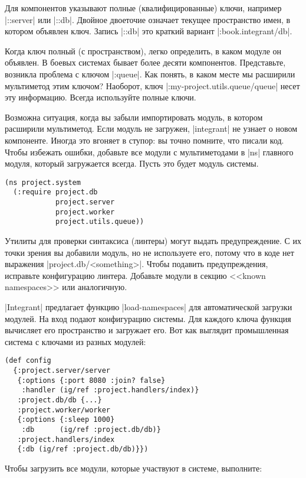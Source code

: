 Для компонентов указывают полные (квалифицированные) ключи, например
\spverb|::server| или \spverb|::db|. Двойное двоеточие означает текущее
пространство имен, в котором объявлен ключ. Запись \spverb|::db| это краткий
вариант \spverb|:book.integrant/db|.

Когда ключ полный (с пространством), легко определить, в каком модуле он
объявлен. В боевых системах бывает более десяти компонентов. Представьте,
возникла проблема с ключом \spverb|:queue|. Как понять, в каком месте мы
расширили мультиметод этим ключом? Наоборот, ключ
\spverb|:my-project.utils.queue/queue| несет эту информацию. Всегда используйте
полные ключи.

Возможна ситуация, когда вы забыли импортировать модуль, в котором расширили
мультиметод. Если модуль не загружен, \spverb|integrant| не узнает о новом
компоненте. Иногда это вгоняет в ступор: вы точно помните, что писали код. Чтобы
избежать ошибки, добавьте все модули с мультиметодами в \spverb|ns| главного
модуля, который загружается всегда. Пусть это будет модуль системы.

\begin{verbatim}
(ns project.system
  (:require project.db
            project.server
            project.worker
            project.utils.queue))
\end{verbatim}

Утилиты для проверки синтаксиса (линтеры) могут выдать предупреждение. С их
точки зрения вы добавили модуль, но не используете его, потому что в коде нет
выражения \spverb|project.db/<something>|. Чтобы подавить предупреждения,
исправьте конфигурацию линтера. Добавьте модули в секцию <<known namespaces>>
или аналогичную.

\spverb|Integrant| предлагает функцию \spverb|load-namespaces| для
автоматической загрузки модулей. На вход подают конфигурацию системы. Для
каждого ключа функция вычисляет его пространство и загружает его. Вот как
выглядит промышленная система с ключами из разных модулей:

\begin{verbatim}
(def config
  {:project.server/server
   {:options {:port 8080 :join? false}
    :handler (ig/ref :project.handlers/index)}
   :project.db/db {...}
   :project.worker/worker
   {:options {:sleep 1000}
    :db      (ig/ref :project.db/db)}
   :project.handlers/index
   {:db (ig/ref :project.db/db)}})
\end{verbatim}

Чтобы загрузить все модули, которые участвуют в системе, выполните:

